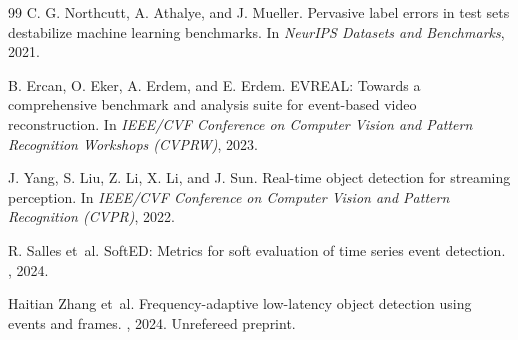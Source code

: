 \documentclass[10pt,twocolumn,letterpaper]{article}
\begin{document}
{\begin{thebibliography}{99}
C. G. Northcutt, A. Athalye, and J. Mueller.
\newblock Pervasive label errors in test sets destabilize machine learning
benchmarks.
\newblock In {\em NeurIPS Datasets and Benchmarks}, 2021.

B. Ercan, O. Eker, A. Erdem, and E. Erdem.
\newblock EVREAL: Towards a comprehensive benchmark and analysis suite for
event-based video reconstruction.
\newblock In {\em IEEE/CVF Conference on Computer Vision and Pattern Recognition
Workshops (CVPRW)}, 2023.

J. Yang, S. Liu, Z. Li, X. Li, and J. Sun.
\newblock Real-time object detection for streaming perception.
\newblock In {\em IEEE/CVF Conference on Computer Vision and Pattern Recognition
(CVPR)}, 2022.

R. Salles et~al.
SoftED: Metrics for soft evaluation of time series event detection.
, 2024.

Haitian Zhang et~al.
Frequency-adaptive low-latency object detection using events and frames.
, 2024. Unrefereed preprint.

\end{thebibliography}
}
\end{document}
